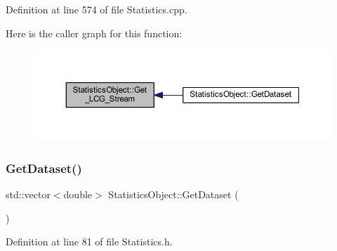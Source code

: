 Definition at line 574 of file Statistics.\+cpp.

Here is the caller graph for this function\+:\nopagebreak
\begin{figure}[H]
\begin{center}
\leavevmode
\includegraphics[width=350pt]{class_statistics_object_a983e11b6d3562ae303f5cc925be448e2_icgraph}
\end{center}
\end{figure}
\mbox{\label{class_statistics_object_a38f772ec93c2e0631cb101aff8296b54}} 
\subsubsection{\texorpdfstring{Get\+Dataset()}{GetDataset()}}
{\footnotesize\ttfamily std\+::vector$<$double$>$ Statistics\+Object\+::\+Get\+Dataset (\begin{DoxyParamCaption}{ }\end{DoxyParamCaption})\hspace{0.3cm}{\ttfamily [inline]}}



Definition at line 81 of file Statistics.\+h.

